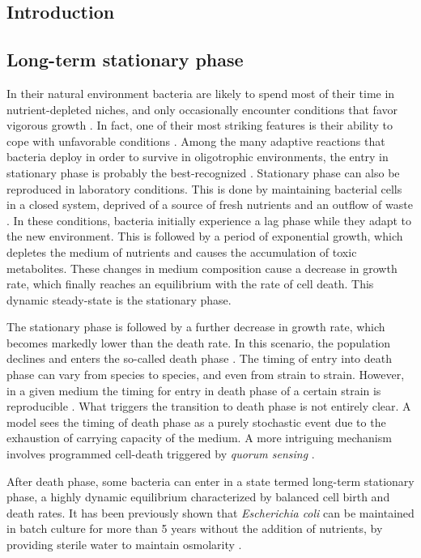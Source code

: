 \documentclass[
    11pt,
    a4paper,
    twoside
]{article} %
\begin{document}
\begin{multicols}{2}

\section*{Introduction}
\subsection*{Long-term stationary phase}
In their natural environment bacteria are likely to spend most of their time in nutrient-depleted niches, and only occasionally encounter conditions that favor vigorous growth \citep{Morita1997}.
In fact, one of their most striking features is their ability to cope with unfavorable conditions \citep{Ksiazek2010}.
Among the many adaptive reactions that bacteria deploy in order to survive in oligotrophic environments, the entry in stationary phase is probably the best-recognized \citep{Kolter1993}.
Stationary phase can also be reproduced in laboratory conditions.
This is done by maintaining bacterial cells in a closed system, deprived of a source of fresh nutrients and an outflow of waste \citep{Ksiazek2010}.
In these conditions, bacteria initially experience a lag phase while they adapt to the new environment.
This is followed by a period of exponential growth, which depletes the medium of nutrients and causes the accumulation of toxic metabolites.
These changes in medium composition cause a decrease in growth rate, which finally reaches an equilibrium with the rate of cell death.
This dynamic steady-state is the stationary phase.

The stationary phase is followed by a further decrease in growth rate, which becomes markedly lower than the death rate.
In this scenario, the population declines and enters the so-called death phase \citep{Pommerville2004}.
The timing of entry into death phase can vary from species to species, and even from strain to strain.
However, in a given medium the timing for entry in death phase of a certain strain is reproducible \citep{Finkel2006}.
What triggers the transition to death phase is not entirely clear.
A model sees the timing of death phase as a purely stochastic event due to the exhaustion of carrying capacity of the medium.
A more intriguing mechanism involves programmed cell-death triggered by \textit{quorum sensing} \citep{Finkel2006}.

After death phase, some bacteria can enter in a state termed long-term stationary phase, a highly dynamic equilibrium characterized by balanced cell birth and death rates.
It has been previously shown that \textit{Escherichia coli} can be maintained in batch culture for more than 5 years without the addition of nutrients, by providing sterile water to maintain osmolarity \citep{Finkel1999}.


\end{multicols}
\end{document}
